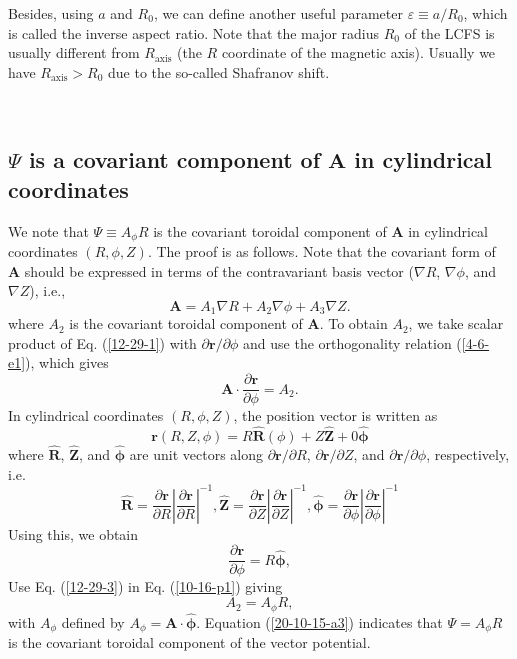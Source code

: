 \documentclass{llncs}
\newcommand{\tmmathbf}[1]{\ensuremath{\boldsymbol{#1}}}
\newcommand{\tmop}[1]{\ensuremath{\operatorname{#1}}}
\begin{document}
Besides, using $a$ and $R_0$, we can define another useful parameter
$\varepsilon \equiv a / R_0$, which is called the inverse aspect ratio. Note
that the major radius $R_0$ of the LCFS is usually different from
$R_{\tmop{axis}}$ (the $R$ coordinate of the magnetic axis). Usually we have
$R_{\tmop{axis}} > R_0$ due to the so-called Shafranov shift.

\

\subsection{$\Psi$ is a covariant component of $\mathbf{A}$ in cylindrical
coordinates}

We note that $\Psi \equiv A_{\phi} R$ is the covariant toroidal component of
$\mathbf{A}$ in cylindrical coordinates $(R, \phi, Z)$. The proof is as
follows. Note that the covariant form of $\mathbf{A}$ should be expressed in
terms of the contravariant basis vector ($\nabla R$, $\nabla \phi$, and
$\nabla Z$), i.e.,
\begin{equation}
  \label{12-29-1} \mathbf{A}= A_1 \nabla R + A_2 \nabla \phi + A_3 \nabla Z.
\end{equation}
where $A_2$ is the covariant toroidal component of $\mathbf{A}$. To obtain
$A_2$, we take scalar product of Eq. (\ref{12-29-1}) with $\partial
\mathbf{r}/ \partial \phi$ and use the orthogonality relation (\ref{4-6-e1}),
which gives
\begin{equation}
  \label{10-16-p1} \mathbf{A} \cdot \frac{\partial \mathbf{r}}{\partial \phi}
  = A_2 .
\end{equation}
In cylindrical coordinates $(R, \phi, Z)$, the position vector is written as
\begin{equation}
  \mathbf{r} (R, Z, \phi) = R \hat{\mathbf{R}} (\phi) + Z \hat{\mathbf{Z}} + 0
  \hat{\tmmathbf{\phi}}
\end{equation}
where $\hat{\mathbf{R}}$, $\hat{\mathbf{Z}}$, and $\hat{\tmmathbf{\phi}}$ are
unit vectors along $\partial \mathbf{r}/ \partial R$, $\partial \mathbf{r}/
\partial Z$, and $\partial \mathbf{r}/ \partial \phi$, respectively, i.e.
\begin{equation}
  \hat{\mathbf{R}} = \frac{\partial \mathbf{r}}{\partial R} \left|
  \frac{\partial \mathbf{r}}{\partial R} \right|^{- 1}, \hat{\mathbf{Z}} =
  \frac{\partial \mathbf{r}}{\partial Z} \left| \frac{\partial
  \mathbf{r}}{\partial Z} \right|^{- 1}, \hat{\tmmathbf{\phi}} =
  \frac{\partial \mathbf{r}}{\partial \phi} \left| \frac{\partial
  \mathbf{r}}{\partial \phi} \right|^{- 1}
\end{equation}
Using this, we obtain
\begin{equation}
  \label{12-29-3} \frac{\partial \mathbf{r}}{\partial \phi} = R
  \hat{\tmmathbf{\phi}},
\end{equation}
Use Eq. (\ref{12-29-3}) in Eq. (\ref{10-16-p1}) giving
\begin{equation}
  \label{20-10-15-a3} A_2 = A_{\phi} R,
\end{equation}
with $A_{\phi}$ defined by $A_{\phi} =\mathbf{A} \cdot \hat{\tmmathbf{\phi}}$.
Equation (\ref{20-10-15-a3}) indicates that $\Psi = A_{\phi} R$ is the
covariant toroidal component of the vector potential.
\end{document}
